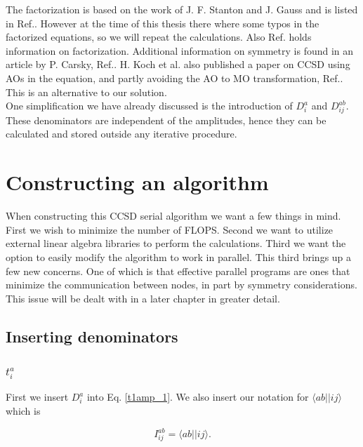 \documentclass[a4paper,norsk,11pt,twoside]{report}
\begin{document}
The factorization is based on the work of J. F. Stanton and J. Gauss and is listed in Ref.\cite{ccsd_fac1}. However at the time of this thesis there where some typos in the factorized equations, so we will repeat the calculations. Also Ref.\cite{ccsd_fac3} holds information on factorization. Additional information on symmetry is found in an article by P. Carsky, Ref.\cite{ccsd_fac2}. H. Koch et al. also published a paper on CCSD using AOs in the equation, and partly avoiding the AO to MO transformation, Ref.\cite{ccsd_fac4}. This is an alternative to our solution. \\

One simplification we have already discussed is the introduction of $D_i^a$ and $D_{ij}^{ab}$. These denominators are independent of the amplitudes, hence they can be calculated and stored outside any iterative procedure.

\newpage

\section{Constructing an algorithm}
When constructing this CCSD serial algorithm we want a few things in mind. First we wish to minimize the number of FLOPS. Second we want to utilize external linear algebra libraries to perform the calculations. Third we want the option to easily modify the algorithm to work in parallel. This third brings up a few new concerns. One of which is that effective parallel programs are ones that minimize the communication between nodes, in part by  symmetry considerations. This issue will be dealt with in a later chapter in greater detail.

\subsection{Inserting denominators}

\subsubsection{$t_i^a$}
First we insert $D_i^a$ into Eq. \eqref{t1amp_1}. We also insert our notation for $\langle ab || ij \rangle$ which is

\begin{equation}
I_{ij}^{ab} = \langle ab || ij \rangle .
\end{equation}
\end{document}

